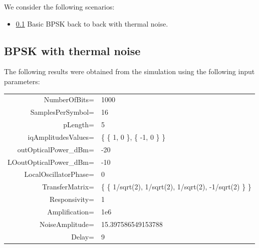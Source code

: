 \documentclass[a4paper]{article}
\begin{document}
We consider the following scenarios:
\begin{itemize}
\item \ref{subsec:scenario1} Basic BPSK back to back with  thermal noise.
\end{itemize}

\subsection{BPSK with thermal noise}\label{subsec:scenario1}

The following results were obtained from the simulation using the following input parameters:
\begin{table}[H]
\centering
\begin{tabular}{rl}
NumberOfBits=           & 1000                                                     \\
SamplesPerSymbol=       & 16                                                       \\
pLength=                & 5                                                        \\
iqAmplitudesValues=     & \{ \{ 1, 0 \}, \{ -1, 0 \} \}                            \\
outOpticalPower\_dBm=   & -20                                                      \\
LOoutOpticalPower\_dBm= & -10                                                      \\
LocalOscillatorPhase=   & 0                                                        \\
TransferMatrix=         & \{ \{ 1/sqrt(2), 1/sqrt(2), 1/sqrt(2), -1/sqrt(2) \} \}  \\
Responsivity=           & 1                                                        \\
Amplification=          & 1e6                                                      \\
NoiseAmplitude=         & 15.397586549153788                                       \\
Delay=                  & 9                                                        \\
\end{tabular}
\end{table}
\end{document}
